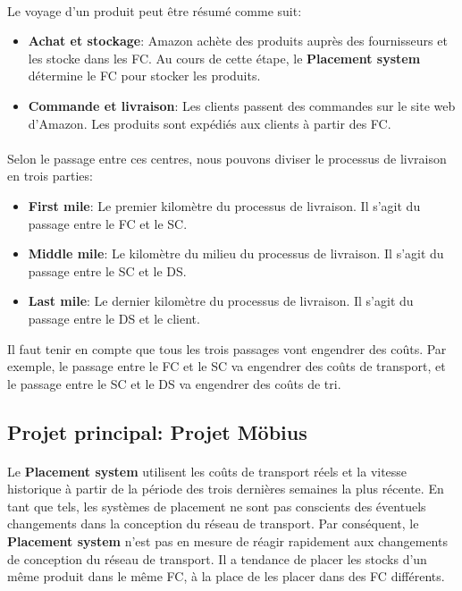 \paragraph{}
\vspace{-2em}
Le voyage d'un produit peut être résumé comme suit:
\begin{itemize}
    \item \textbf{Achat et stockage}: Amazon achète des produits auprès des fournisseurs et les stocke dans les FC. Au cours de cette étape, le \textbf{Placement system} détermine le FC pour stocker les produits.
    \item \textbf{Commande et livraison}: Les clients passent des commandes sur le site web d'Amazon. Les produits sont expédiés aux clients à partir des FC.
\end{itemize}
\paragraph{}
\vspace{-2em}
Selon le passage entre ces centres, nous pouvons diviser le processus de livraison en trois parties:
\begin{itemize}
    \item \textbf{First mile}: Le premier kilomètre du processus de livraison. Il s'agit du passage entre le FC et le SC.
    \item \textbf{Middle mile}: Le kilomètre du milieu du processus de livraison. Il s'agit du passage entre le SC et le DS.
    \item \textbf{Last mile}: Le dernier kilomètre du processus de livraison. Il s'agit du passage entre le DS et le client.
\end{itemize}

Il faut tenir en compte que tous les trois passages vont engendrer des coûts. Par exemple, le passage entre le FC et le SC va engendrer des coûts de transport, et le passage entre le SC et le DS va engendrer des coûts de tri.

\subsection{Projet principal: Projet Möbius}
\paragraph{}
\vspace{-2em}
Le \textbf{Placement system} utilisent les coûts de transport réels et la vitesse historique à partir de la période des trois dernières semaines la plus récente. En tant que tels, les systèmes de placement ne sont pas conscients des éventuels changements dans la conception du réseau de transport. Par conséquent, le \textbf{Placement system} n'est pas en mesure de réagir rapidement aux changements de conception du réseau de transport. Il a tendance de placer les stocks d'un même produit dans le même FC, à la place de les placer dans des FC différents. 


